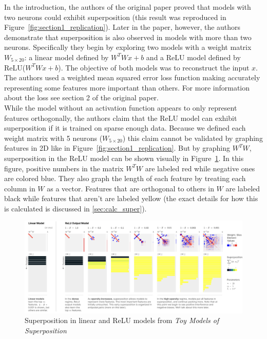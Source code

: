 \documentclass{article} %
\begin{document}
In the introduction, the authors of the original paper proved that models with 
two neurons could exhibit superposition (this result was reproduced in Figure~\ref{fig:section1_replication}).
Later in the paper, however, the authors demonstrate that superposition
is also observed in models with more than two neurons. Specifically they begin 
by exploring two models with a weight matrix $W_{5 \times 20}$: a linear model defined by 
$W^TWx + b$ and a ReLU model defined by ReLU($W^TWx + b$). The objective of both
models was to reconstruct the input $x$. The authors used a weighted mean squared
error loss function making accurately representing some features more important
than others. For more information about the loss see section 2 of the original
paper.\\

While the model without an activation function appears to only represent features
orthogonally, the authors claim that the ReLU model can exhibit superposition
if it is trained on sparse enough data. Because we defined each weight matrix with 5 neurons ($W_{5 \times 20}$)
this claim cannot be validated by graphing features in 2D like in Figure~\ref{fig:section1_replication}. 
But by graphing $W^TW$, superposition in the ReLU model can be shown visually in Figure~\ref{fig:section3_anthropic}. 
In this figure, positive numbers in the matrix $W^TW$ are labeled red while 
negative ones are colored blue. They also graph the length of each feature by treating 
each column in $W$ as a vector. Features that are orthogonal to others in $W$ are 
labeled black while features that aren't are labeled yellow
(the exact details for how this is calculated is discussed in \ref{sec:calc_super}).\\

\begin{figure}[h]
    \centering
    \includegraphics[width=0.9\linewidth]{demonstrating_superposition/images/anthropic_section3.png}
    \captionsetup{font=footnotesize} %
    \caption{Superposition in linear and ReLU models from \textit{Toy Models of Superposition}\cite{elhage2022toy}}
    \label{fig:section3_anthropic}
\end{figure}
\end{document}
